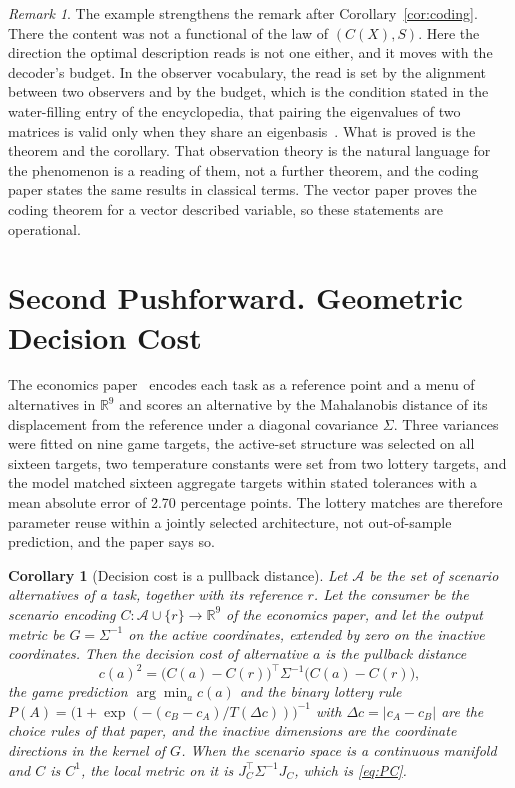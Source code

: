 \documentclass[11pt]{article}
\newtheorem{corollary}{Corollary}
\theoremstyle{definition}
\theoremstyle{remark}
\newtheorem*{remark}{Remark}
\newcommand{\R}{\mathbb{R}}
\begin{document}
\begin{remark}
The example strengthens the remark after Corollary~\ref{cor:coding}.
There the content was not a functional of the law of $(C(X),S)$.
Here the direction the optimal description reads is not one either, and it moves with the decoder's budget.
In the observer vocabulary, the read is set by the alignment between two observers and by the budget, which is the condition stated in the water-filling entry of the encyclopedia, that pairing the eigenvalues of two matrices is valid only when they share an eigenbasis~\cite{bond2026encyclopedia}.
What is proved is the theorem and the corollary.
That observation theory is the natural language for the phenomenon is a reading of them, not a further theorem, and the coding paper states the same results in classical terms.
The vector paper proves the coding theorem for a vector described variable, so these statements are operational.
\end{remark}

\section{Second Pushforward. Geometric Decision Cost}
\label{sec:decision}

The economics paper~\cite{bond2026tcss} encodes each task as a reference point and a menu of alternatives in $\R^{9}$ and scores an alternative by the Mahalanobis distance of its displacement from the reference under a diagonal covariance $\Sigma$.
Three variances were fitted on nine game targets, the active-set structure was selected on all sixteen targets, two temperature constants were set from two lottery targets, and the model matched sixteen aggregate targets within stated tolerances with a mean absolute error of 2.70 percentage points.
The lottery matches are therefore parameter reuse within a jointly selected architecture, not out-of-sample prediction, and the paper says so.

\begin{corollary}[Decision cost is a pullback distance]
\label{cor:decision}
Let $\mathcal{A}$ be the set of scenario alternatives of a task, together with its reference $r$. Let the consumer be the scenario encoding $C:\mathcal{A}\cup\{r\}\to\R^{9}$ of the economics paper, and let the output metric be $G=\Sigma^{-1}$ on the active coordinates, extended by zero on the inactive coordinates. Then the decision cost of alternative $a$ is the pullback distance
\begin{equation}
c(a)^{2}=\bigl(C(a)-C(r)\bigr)^{\top}\Sigma^{-1}\bigl(C(a)-C(r)\bigr),
\label{eq:cost}
\end{equation}
the game prediction $\arg\min_{a}c(a)$ and the binary lottery rule $P(A)=\bigl(1+\exp(-(c_{B}-c_{A})/T(\Delta c))\bigr)^{-1}$ with $\Delta c=|c_{A}-c_{B}|$ are the choice rules of that paper, and the inactive dimensions are the coordinate directions in the kernel of $G$. When the scenario space is a continuous manifold and $C$ is $C^{1}$, the local metric on it is $J_{C}^{\top}\Sigma^{-1}J_{C}$, which is \eqref{eq:PC}.
\end{corollary}
\end{document}
